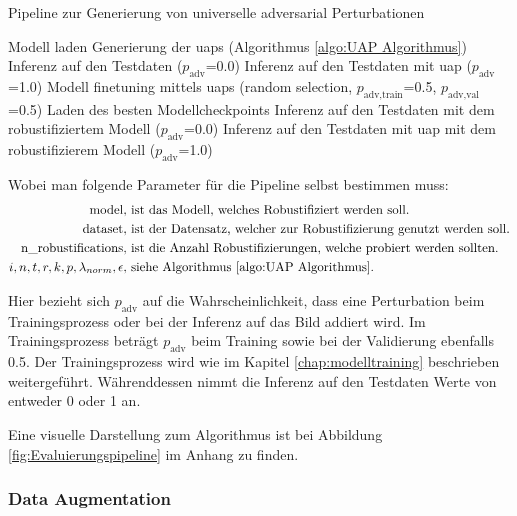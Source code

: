 \begin{algorithm}
\caption{Pipeline zur Generierung von universelle adversarial Perturbationen}
\label{alg:UAP_Pseudo_Algorithmmus}
\begin{algorithmic}[1]
\STATE Modell laden
    \STATE Generierung der \acrshort{uap}s (Algorithmus \ref{algo:UAP Algorithmus})
    \STATE Inferenz auf den Testdaten ($p_{\text{adv}}$=0.0)
        \STATE Inferenz auf den Testdaten mit \acrshort{uap} ($p_{\text{adv}}$=1.0)
    \ENDFOR
    \STATE Modell finetuning mittels \acrshort{uap}s (random selection, $p_{\text{adv},\text{train}}$=0.5, $p_{\text{adv},\text{val}}$=0.5)
    \STATE Laden des besten Modellcheckpoints
    \STATE Inferenz auf den Testdaten mit dem robustifiziertem Modell ($p_{\text{adv}}$=0.0)
        \STATE Inferenz auf den Testdaten mit \acrshort{uap} mit dem robustifizierem Modell ($p_{\text{adv}}$=1.0)
    \ENDFOR
\ENDFOR
\end{algorithmic}
\end{algorithm}

Wobei man folgende Parameter für die Pipeline selbst bestimmen muss:
\begin{align*}
\text{model}, &\text{ ist das Modell, welches Robustifiziert werden soll.} \\
\text{dataset}, &\text{ ist der Datensatz, welcher zur Robustifizierung genutzt werden soll.} \\
\text{n\_robustifications}, &\text{ ist die Anzahl Robustifizierungen, welche probiert werden sollten.} \\
i,n,t,r,k,p,\lambda_{norm},\epsilon, &\text{ siehe Algorithmus \ref{algo:UAP Algorithmus}.}
\end{align*}

Hier bezieht sich $p_{\text{adv}}$ auf die Wahrscheinlichkeit, dass eine Perturbation beim Trainingsprozess oder bei der Inferenz auf das Bild addiert wird. Im Trainingsprozess beträgt $p_{\text{adv}}$ beim Training sowie bei der Validierung ebenfalls 0.5. Der Trainingsprozess wird wie im Kapitel \ref{chap:modelltraining} beschrieben weitergeführt. Währenddessen nimmt die Inferenz auf den Testdaten Werte von entweder 0 oder 1 an. 

Eine visuelle Darstellung zum Algorithmus ist bei Abbildung \ref{fig:Evaluierungspipeline} im Anhang zu finden.


\subsubsection{Data Augmentation}

